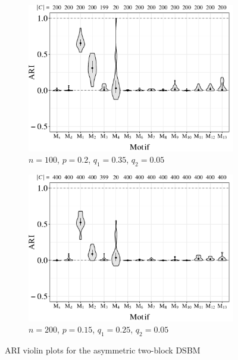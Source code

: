 \begin{figure}[H]
	\begin{subfigure}{.49\textwidth}
		\centering
		\includegraphics[scale=0.4,draft=false]{../../results/motifasym/motifasym_1.pdf}
		\caption{$n=100$, $p=0.2$, $q_1=0.35$, $q_2=0.05$}
	\end{subfigure}
	\begin{subfigure}{.49\textwidth}
		\centering
		\includegraphics[scale=0.4,draft=false]{../../results/motifasym/motifasym_2.pdf}
		\caption{$n=200$, $p=0.15$, $q_1=0.25$, $q_2=0.05$}
	\end{subfigure}
	\caption{ARI violin plots for the asymmetric two-block DSBM}
	\label{fig:motifasym}
\end{figure}











